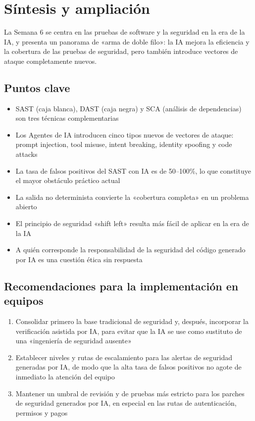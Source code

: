 \section{Síntesis y ampliación}

La Semana 6 se centra en las pruebas de software y la seguridad en la era de la IA, y presenta un panorama de «arma de doble filo»: la IA mejora la eficiencia y la cobertura de las pruebas de seguridad, pero también introduce vectores de ataque completamente nuevos.

\subsection{Puntos clave}

\begin{itemize}
    \item SAST (caja blanca), DAST (caja negra) y SCA (análisis de dependencias) son tres técnicas complementarias
    \item Los Agentes de IA introducen cinco tipos nuevos de vectores de ataque: prompt injection, tool misuse, intent breaking, identity spoofing y code attacks
    \item La tasa de falsos positivos del SAST con IA es de 50--100\%, lo que constituye el mayor obstáculo práctico actual
    \item La salida no determinista convierte la «cobertura completa» en un problema abierto
    \item El principio de seguridad «shift left» resulta más fácil de aplicar en la era de la IA
    \item A quién corresponde la responsabilidad de la seguridad del código generado por IA es una cuestión ética sin respuesta
\end{itemize}

\subsection{Recomendaciones para la implementación en equipos}

\begin{enumerate}
    \item Consolidar primero la base tradicional de seguridad y, después, incorporar la verificación asistida por IA, para evitar que la IA se use como sustituto de una «ingeniería de seguridad ausente»
    \item Establecer niveles y rutas de escalamiento para las alertas de seguridad generadas por IA, de modo que la alta tasa de falsos positivos no agote de inmediato la atención del equipo
    \item Mantener un umbral de revisión y de pruebas más estricto para los parches de seguridad generados por IA, en especial en las rutas de autenticación, permisos y pagos
\end{enumerate}

